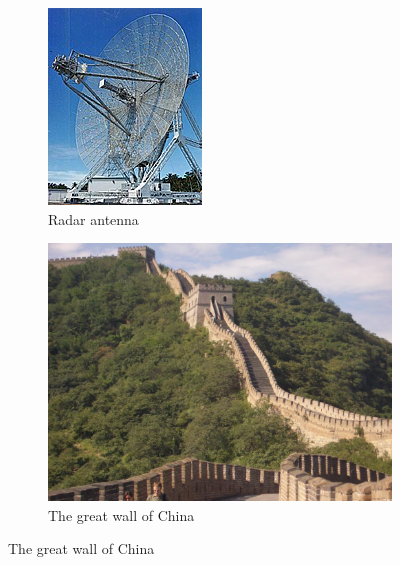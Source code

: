 \begin{figure}[ht]
    \centering 
    \begin{subfigure}[b]{0.281\textwidth} 
        \includegraphics[width=\textwidth]{figures/Radar_antenna.jpg} 
        \caption{Radar antenna} 
        \label{fig:intro_radar} 
    \end{subfigure} 
    \begin{subfigure}[b]{0.48\textwidth} 
        \includegraphics[width=\textwidth]{figures/great_wall.jpg} 
        \caption{The great wall of China} 
        \label{fig:intro_great_wall} 
    \end{subfigure} 
\end{figure} 

